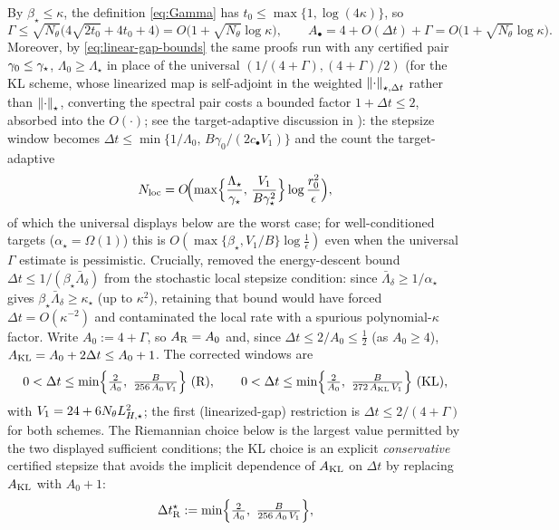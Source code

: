\begin{remark}
\label{rem:local-condnum}
By $\beta_\star\leq\kappa$, the definition \eqref{eq:Gamma} has $t_0\leq\max\{1,\log(4\kappa)\}$, so
\[
    \Gamma\leq\sqrt{N_\theta}\bigl(4\sqrt{2t_0}+4t_0+4\bigr)=O\bigl(1+\sqrt{N_\theta}\log\kappa\bigr),
    \qquad A_\bullet=4+O(\Delta t)+\Gamma=O\bigl(1+\sqrt{N_\theta}\log\kappa\bigr).
\]
Moreover, by \eqref{eq:linear-gap-bounds} the same proofs run with any certified pair
$\gamma_0\leq\gamma_\star$, $\Lambda_0\geq\Lambda_\star$ in place of the universal
$(1/(4+\Gamma),(4+\Gamma)/2)$ (for the KL scheme, whose linearized map is self-adjoint in the weighted
$\left\lVert \cdot\right\rVert_{\star,\Delta t}$ rather than $\left\lVert \cdot\right\rVert_\star$, converting the spectral pair costs a
bounded factor $1+\Delta t\leq2$, absorbed into the $O(\cdot)$; see the target-adaptive discussion in
): the stepsize window becomes
$\Delta t\leq\min\{1/\Lambda_0,\,B\gamma_0/(2c_\bullet V_1)\}$ and the count the target-adaptive
\[
    N_{\mathrm{loc}}=O\!\Bigl(\max\Bigl\{\frac{\Lambda_\star}{\gamma_\star},\,\frac{V_1}{B\gamma_\star^2}\Bigr\}\log\frac{r_0^2}\epsilon\Bigr),
\]
of which the universal displays below are the worst case; for well-conditioned targets
($\alpha_\star=\Omega(1)$) this is $O(\max\{\beta_\star,V_1/B\}\log\tfrac1\epsilon)$ even when the
universal $\Gamma$ estimate is pessimistic.
Crucially,  removed the energy-descent bound
$\Delta t\leq1/(\beta_\star\bar\Lambda_\delta)$ from the stochastic local stepsize condition: since
$\bar\Lambda_\delta\geq1/\alpha_\star$ gives $\beta_\star\bar\Lambda_\delta\geq\kappa_\star$ (up to
$\kappa^2$), retaining that bound would have forced $\Delta t=O(\kappa^{-2})$ and contaminated the
local rate with a spurious polynomial-$\kappa$ factor. Write $A_0:=4+\Gamma$, so $A_{\mathrm{R}}=A_0$ and,
since $\Delta t\leq2/A_0\leq\tfrac12$ (as $A_0\geq4$), $A_{\mathrm{KL}}=A_0+2\Delta t\leq A_0+1$. The corrected
windows are
\[
    0<\Delta t\leq\min\Bigl\{\tfrac2{A_0},\ \tfrac{B}{256\,A_0\,V_1}\Bigr\}\ (\Riem),
    \qquad
    0<\Delta t\leq\min\Bigl\{\tfrac2{A_0},\ \tfrac{B}{272\,A_{\KL}\,V_1}\Bigr\}\ (\KL),
\]
with $V_1=24+6N_\theta L_{H,\star}^2$; the first (linearized-gap) restriction is $\Delta t\leq2/(4+\Gamma)$ for
both schemes. The Riemannian choice below is the largest value permitted by the two displayed
sufficient conditions; the KL choice is an explicit \emph{conservative} certified stepsize that avoids
the implicit dependence of $A_{\mathrm{KL}}$ on $\Delta t$ by replacing $A_{\mathrm{KL}}$ with $A_0+1$:
\[
    \Delta t_{\Riem}^\star:=\min\Bigl\{\tfrac2{A_0},\ \tfrac{B}{256\,A_0\,V_1}\Bigr\},
\]
\end{remark}

